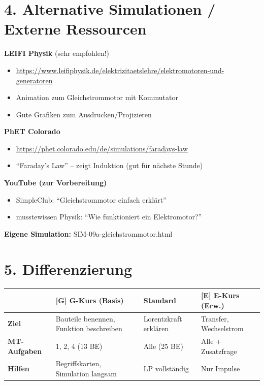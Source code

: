 \documentclass[11pt, a4paper]{article}
\newcommand{\stession}{09a}
\newcommand{\Gkurs}{\textcolor{basis}{\textbf{[G]}}}
\newcommand{\Ekurs}{\textcolor{erweiterung}{\textbf{[E]}}}
\begin{document}

\section*{4. Alternative Simulationen / Externe Ressourcen}

\begin{warnbox}
\textbf{LEIFI Physik} (sehr empfohlen!)
\begin{itemize}
    \item \url{https://www.leifiphysik.de/elektrizitaetslehre/elektromotoren-und-generatoren}
    \item Animation zum Gleichstrommotor mit Kommutator
    \item Gute Grafiken zum Ausdrucken/Projizieren
\end{itemize}

\textbf{PhET Colorado}
\begin{itemize}
    \item \url{https://phet.colorado.edu/de/simulations/faradays-law}
    \item ``Faraday's Law'' -- zeigt Induktion (gut für nächste Stunde)
\end{itemize}

\textbf{YouTube (zur Vorbereitung)}
\begin{itemize}
    \item SimpleClub: ``Gleichstrommotor einfach erklärt''
    \item musstewissen Physik: ``Wie funktioniert ein Elektromotor?''
\end{itemize}

\textbf{Eigene Simulation:} SIM-\stession-gleichstrommotor.html
\end{warnbox}


\section*{5. Differenzierung}

\begin{tabular}{|l|p{4cm}|p{4cm}|p{4cm}|}
\hline
& \Gkurs{} \textbf{G-Kurs (Basis)} & \textbf{Standard} & \Ekurs{} \textbf{E-Kurs (Erw.)} \\
\hline
\textbf{Ziel} & Bauteile benennen, Funktion beschreiben & Lorentzkraft erklären & Transfer, Wechselstrom \\
\hline
\textbf{MT-Aufgaben} & 1, 2, 4 (13 BE) & Alle (25 BE) & Alle + Zusatzfrage \\
\hline
\textbf{Hilfen} & Begriffskarten, Simulation langsam & LP vollständig & Nur Impulse \\
\hline
\end{tabular}
\end{document}
